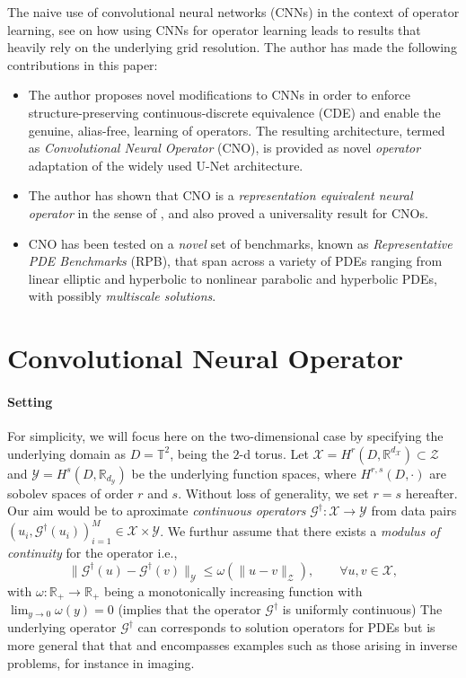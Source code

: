 \documentclass[reqno,10pt]{amsart}
\theoremstyle{plain}
\theoremstyle{definition}
\newcommand{\bb}[1]{\mathbb{#1}}
\newcommand{\cal}[1]{\mathcal{#1}}
\begin{document}
    \noindent The naive use of convolutional neural networks (CNNs) in the context of operator learning, see \cite{FB2023,Zhu2018,ZL2021} on how using CNNs for operator learning leads to results that heavily rely on the underlying grid resolution. The author has made the following contributions in this paper:
    \begin{itemize}
        \item The author proposes novel modifications to CNNs in order to enforce structure-preserving continuous-discrete equivalence (CDE) and enable the genuine, alias-free, learning of operators. The  resulting architecture, termed as {\it Convolutional Neural Operator} (CNO), is provided as novel {\it operator} adaptation of the widely used U-Net architecture.
        \item The author has shown that CNO is a {\it representation equivalent neural operator} in the sense of \cite{FB2023}, and also proved a universality result for CNOs.
        \item CNO has been tested on a {\it novel} set of benchmarks, known as {\it Representative PDE Benchmarks} (RPB), that span across a variety of PDEs ranging from linear elliptic and hyperbolic to nonlinear parabolic and hyperbolic PDEs, with possibly {\it multiscale solutions}. 
    \end{itemize}

    \section{Convolutional Neural Operator}
    \paragraph{\bf Setting} For simplicity, we will focus here on the two-dimensional case by specifying the underlying domain as $D = \bb T^2$, being the $2$-d torus. Let $\cal X = H^r(D,\bb R^{d_{\cal X}}) \subset \cal Z$ and $\cal Y = H^s(D,\bb R_{d_\cal Y})$ be the underlying function spaces, where $H^{r,s}(D,\cdot)$ are sobolev spaces of order $r$ and $s$. Without loss of generality, we set $r = s$ hereafter. Our aim would be to aproximate {\it continuous operators} $\cal G^\dag : \cal X \to \cal Y$ from data pairs $(u_i, \cal G^\dag(u_i))_{i=1}^M \in \cal X \times \cal Y$. We furthur assume that there exists a {\it modulus of continuity} for the operator i.e.,
    \begin{equation}\label{eq2.1}
        \|\cal G^\dag(u) - \cal G^\dag(v)\|_{\cal Y} \leq \omega(\|u - v\|_{\cal Z}), \qquad \forall u,v \in \cal X,
    \end{equation}
    with $\omega : \bb R_+ \to \bb R_+$ being a monotonically increasing function with $\lim_{y\to 0}\omega(y) = 0$ (implies that the operator $\cal G^\dag$ is uniformly continuous) The underlying operator $\cal G^\dag$ can corresponds to solution operators for PDEs but is more general that that and encompasses examples such as those arising in inverse problems, for instance in imaging.
\end{document}
